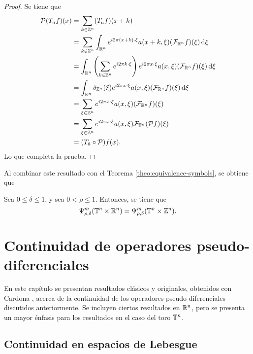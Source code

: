 \begin{proof}
	Se tiene que 
	\begin{align*}
		\mathcal{P}(T_af)(x) & = \sum_{k\in\mathbb{Z}^n}(T_af)(x+k)\\
		& = \sum_{k\in\mathbb{Z}^n}\int_{\mathbb{R}^n} e^{i2\pi(x+k)\cdot\xi}a(x+k, \xi)(\mathcal{F}_{\mathbb{R}^n}f)(\xi) \mathop{}\!\mathrm{d} \xi \\
		& = \int_{\mathbb{R}^n}\left(\sum_{k\in\mathbb{Z}^n}e^{i2\pi k\cdot\xi}\right) e^{i2\pi x\cdot\xi}a(x, \xi)(\mathcal{F}_{\mathbb{R}^n}f)(\xi) \mathop{}\!\mathrm{d} \xi \\
		& = \int_{\mathbb{R}^n}\delta_{\mathbb{Z}^n}(\xi) e^{i2\pi x\cdot\xi}a(x, \xi)(\mathcal{F}_{\mathbb{R}^n}f)(\xi) \mathop{}\!\mathrm{d} \xi \\
		& = \sum_{\xi\in\mathbb{Z}^n}e^{i2\pi x\cdot\xi}a(x, \xi)(\mathcal{F}_{\mathbb{R}^n}f)(\xi) \\
		& = \sum_{\xi\in\mathbb{Z}^n}e^{i2\pi x\cdot\xi}a(x, \xi)\mathcal{F}_{\mathbb{T}^n}(\mathcal{P}f)(\xi)  \\
		& = (T_{\tilde{a}}\circ\mathcal{P})f(x).
	\end{align*}
	Lo que completa la prueba.
\end{proof}
Al combinar este resultado con el Teorema \ref{theo:equivalence-symbols}, se obtiene que 
\begin{corollary}
	Sea $0\leq\delta\leq1$, y sea $0<\rho\leq1$. Entonces, se tiene que 
	\begin{equation*}
		\Psi^m_{\rho,\delta}(\mathbb{T}^n\times\mathbb{R}^n) = \Psi^m_{\rho,\delta}(\mathbb{T}^n\times\mathbb{Z}^n).
	\end{equation*}
\end{corollary}

\chapter{Continuidad de operadores pseudo-diferenciales}
En este capítulo se presentan resultados clásicos y originales, obtenidos con Cardona \cite{Cardona:Martinez, cardona-martinez-II, cardona-martinez-III}, acerca de la continuidad de los operadores pseudo-diferenciales discutidos anteriormente. Se incluyen ciertos resultados en $\mathbb{R}^n$, pero se presenta un mayor énfasis para los resultados en el caso del toro $\mathbb{T}^n$.
\section{Continuidad en espacios de Lebesgue}
